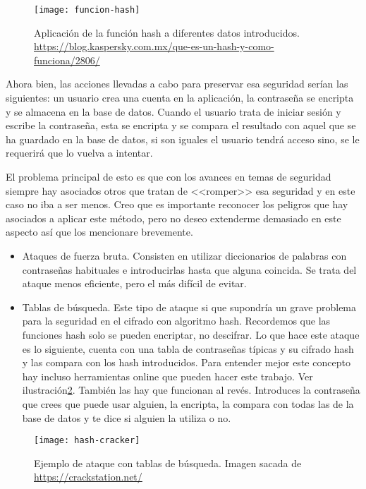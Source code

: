 \begin{figure}[h]
\centering
\texttt{[image: funcion-hash]}
\caption{Aplicación de la función hash a diferentes datos introducidos. \url{https://blog.kaspersky.com.mx/que-es-un-hash-y-como-funciona/2806/}}
\label{fig:3.1}
\end{figure}

Ahora bien, las acciones llevadas a cabo para preservar esa seguridad serían las siguientes: un usuario crea una cuenta en la aplicación, la contraseña se encripta y se almacena en la base de datos. Cuando el usuario trata de iniciar sesión y escribe la contraseña, esta se encripta y se compara el resultado con aquel que se ha guardado en la base de datos, si son iguales el usuario tendrá acceso sino, se le requerirá que lo vuelva a intentar.

El problema principal de esto es que con los avances en temas de seguridad siempre hay asociados otros que tratan de <<romper>> esa seguridad y en este caso no iba a ser menos. Creo que es importante reconocer los peligros que hay asociados a aplicar este método, pero no deseo extenderme demasiado en este aspecto así que los mencionare brevemente.


\begin{itemize}
\item Ataques de fuerza bruta. Consisten en utilizar diccionarios de palabras con contraseñas habituales e introducirlas hasta que alguna coincida. Se trata del ataque menos eficiente, pero el más difícil de evitar.
\item Tablas de búsqueda. Este tipo de ataque si que supondría un grave problema para la seguridad en el cifrado con algoritmo hash. Recordemos que las funciones hash solo se pueden encriptar, no descifrar. Lo que hace este ataque es lo siguiente, cuenta con una tabla de contraseñas típicas y su cifrado hash y las compara con los hash introducidos. Para entender mejor este concepto hay incluso herramientas online que pueden hacer este trabajo. Ver ilustración\ref{fig:3.2}. También las hay que funcionan al revés. Introduces la contraseña que crees que puede usar alguien, la encripta, la compara con todas las de la base de datos y te dice si alguien la utiliza o no.
\end{itemize}

\begin{figure}[h]
\centering
\texttt{[image: hash-cracker]}
\caption{Ejemplo de ataque con tablas de búsqueda. Imagen sacada de \url{https://crackstation.net/}}
\label{fig:3.2}
\end{figure}

